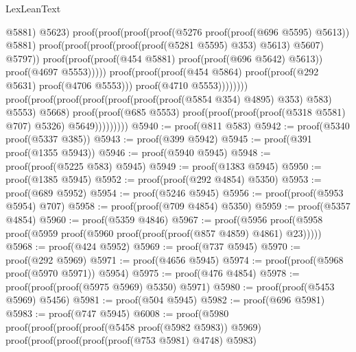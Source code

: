 \begin{lexlean}{LexLeanText}
\begin{coremodule}
                                                      @5881)
                                                    @5623)
                                                  proof(proof(proof(proof(@5276
                                                            proof(proof(@696 @5595) @5613))
                                                          @5881)
                                                        proof(proof(proof(proof(proof(@5281 @5595)
                                                                  @353)
                                                                @5613)
                                                              @5607)
                                                            @5797))
                                                      proof(proof(proof(@454 @5881)
                                                            proof(proof(@696 @5642) @5613))
                                                          proof(@4697 @5553)))))
                                            proof(proof(proof(@454 @5864)
                                                  proof(proof(@292 @5631) proof(@4706 @5553)))
                                                proof(@4710 @5553))))))))
                      proof(proof(proof(proof(proof(proof(proof(@5854 @354) @4895) @353) @583)
                              @5553)
                            @5668)
                          proof(proof(@685 @5553)
                              proof(proof(proof(proof(@5318 @5581) @707) @5326) @5649)))))))))
@5940 := proof(@811 @583)
@5942 := proof(@5340 proof(@5337 @385))
@5943 := proof(@399 @5942)
@5945 := proof(@391 proof(@1355 @5943))
@5946 := proof(@5940 @5945)
@5948 := proof(proof(@5225 @583) @5945)
@5949 := proof(@1383 @5945)
@5950 := proof(@1385 @5945)
@5952 := proof(proof(@292 @4854) @5350)
@5953 := proof(@689 @5952)
@5954 := proof(@5246 @5945)
@5956 := proof(proof(@5953 @5954) @707)
@5958 := proof(proof(@709 @4854) @5350)
@5959 := proof(@5357 @4854)
@5960 := proof(@5359 @4846)
@5967 := proof(@5956
      proof(@5958 proof(@5959 proof(@5960 proof(proof(proof(@857 @4859) @4861) @23)))))
@5968 := proof(@424 @5952)
@5969 := proof(@737 @5945)
@5970 := proof(@292 @5969)
@5971 := proof(@4656 @5945)
@5974 := proof(proof(@5968 proof(@5970 @5971)) @5954)
@5975 := proof(@476 @4854)
@5978 := proof(proof(proof(@5975 @5969) @5350) @5971)
@5980 := proof(proof(@5453 @5969) @5456)
@5981 := proof(@504 @5945)
@5982 := proof(@696 @5981)
@5983 := proof(@747 @5945)
@6008 := proof(@5980
      proof(proof(proof(proof(@5458 proof(@5982 @5983)) @5969)
            proof(proof(proof(proof(proof(@753 @5981) @4748) @5983)

\end{coremodule}
\end{lexlean}
